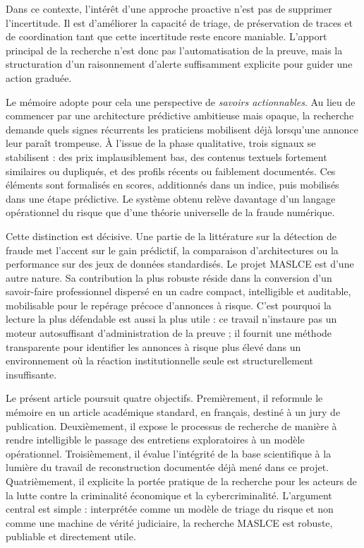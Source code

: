 \documentclass[10pt,a4paper]{article}
\begin{document}
Dans ce contexte, l'intérêt d'une approche proactive n'est pas de supprimer l'incertitude. Il est d'améliorer la capacité de triage, de préservation de traces et de coordination tant que cette incertitude reste encore maniable. L'apport principal de la recherche n'est donc pas l'automatisation de la preuve, mais la structuration d'un raisonnement d'alerte suffisamment explicite pour guider une action graduée.

Le mémoire adopte pour cela une perspective de \emph{savoirs actionnables}. Au lieu de commencer par une architecture prédictive ambitieuse mais opaque, la recherche demande quels signes récurrents les praticiens mobilisent déjà lorsqu'une annonce leur paraît trompeuse. À l'issue de la phase qualitative, trois signaux se stabilisent : des prix implausiblement bas, des contenus textuels fortement similaires ou dupliqués, et des profils récents ou faiblement documentés. Ces éléments sont formalisés en scores, additionnés dans un indice, puis mobilisés dans une étape prédictive. Le système obtenu relève davantage d'un langage opérationnel du risque que d'une théorie universelle de la fraude numérique.

Cette distinction est décisive. Une partie de la littérature sur la détection de fraude met l'accent sur le gain prédictif, la comparaison d'architectures ou la performance sur des jeux de données standardisés. Le projet MASLCE est d'une autre nature. Sa contribution la plus robuste réside dans la conversion d'un savoir-faire professionnel dispersé en un cadre compact, intelligible et auditable, mobilisable pour le repérage précoce d'annonces à risque. C'est pourquoi la lecture la plus défendable est aussi la plus utile : ce travail n'instaure pas un moteur autosuffisant d'administration de la preuve ; il fournit une méthode transparente pour identifier les annonces à risque plus élevé dans un environnement où la réaction institutionnelle seule est structurellement insuffisante.

Le présent article poursuit quatre objectifs. Premièrement, il reformule le mémoire en un article académique standard, en français, destiné à un jury de publication. Deuxièmement, il expose le processus de recherche de manière à rendre intelligible le passage des entretiens exploratoires à un modèle opérationnel. Troisièmement, il évalue l'intégrité de la base scientifique à la lumière du travail de reconstruction documentée déjà mené dans ce projet. Quatrièmement, il explicite la portée pratique de la recherche pour les acteurs de la lutte contre la criminalité économique et la cybercriminalité. L'argument central est simple : interprétée comme un modèle de triage du risque et non comme une machine de vérité judiciaire, la recherche MASLCE est robuste, publiable et directement utile.
\end{document}
